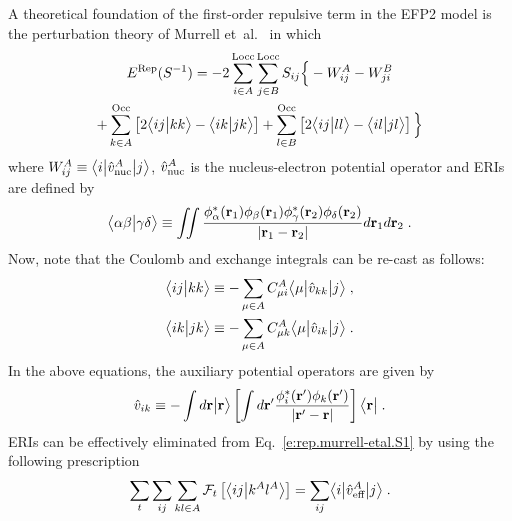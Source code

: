 A theoretical foundation of the
first\hyp{}order repulsive term in the EFP2 model
is the perturbation theory of
Murrell et~al.~\cite{Murrell.Randic.Williams.Longuet-Higgins.ProcRSocLondA.1965} 
in which
%
\begin{multline} \label{e:rep.murrell-etal.S1}
    E^{\rm Rep}(S^{-1}) = -2\sum_{i\in A}^{\rm Locc} \sum_{j\in B}^{\rm Locc}
               S_{ij} \Big\{
         - W^A_{ij} 
         - W^B_{ji} \\
 + \sum_{k\in A}^{\rm Occ} \left[ 2\BraKet{ij}{kk} - \BraKet{ik}{jk} \right] 
 + \sum_{l\in B}^{\rm Occ} \left[ 2\BraKet{ij}{ll} - \BraKet{il}{jl} \right]
                \Big\}
\end{multline}
%
where $W^A_{ij} \equiv \tBraKet{i}{\hat{v}^A_{\rm nuc}}{j}$,
$\hat{v}^A_{\rm nuc}$
is the nucleus\hyp{}electron potential operator
and
ERIs are defined by
%
\begin{equation} \label{e:eri}
	\BraKet{\alpha\beta}{\gamma\delta} \equiv
	\iint 
	\frac{ \phi_\alpha^{*}({\bf r}_1) \phi_\beta({\bf r}_1) 
	       \phi_\gamma^{*}({\bf r}_2) \phi_\delta({\bf r}_2) }{ \vert {\bf r}_1 - {\bf r}_2 \vert}
	d{\bf r}_1 d{\bf r}_2  \;.
\end{equation}
%
Now, note that the Coulomb and exchange integrals can be re\hyp{}cast as follows:
%
\begin{subequations}
 \begin{align}
 \BraKet{ij}{kk} &\equiv - \sum_{\mu\in A} 
     C_{\mu i}^A \tBraKet{\mu}{\hat{v}_{kk}}{j} \;, \\
 \BraKet{ik}{jk} &\equiv - \sum_{\mu\in A} 
     C_{\mu k}^A \tBraKet{\mu}{\hat{v}_{ik}}{j} \;.
 \end{align}
\end{subequations}
%
%
%
In the above equations, the auxiliary potential operators are given by
%
\begin{equation}
  \hat{v}_{ik} \equiv - \int d{\bf r} \Ket{{\bf r}} 
        \left[
        \int d{\bf r}' \frac{\phi_i^{*}({\bf r}') \phi_k({\bf r}')}{\vert {\bf r}' - {\bf r}\vert}
        \right] \Bra{{\bf r}} \;.
\end{equation}
%
ERIs can be effectively eliminated from Eq.~\eqref{e:rep.murrell-etal.S1} 
by using the following prescription~\cite{Blasiak.Bednarska.Choluj.Bartkowiak.JCP.2019}
%
\begin{equation} \label{e:ft-reduction}
	\sum_t \sum_{ij}\sum_{kl\in A} {\mathcal{F}}_t\left[ 
   \BraKet{ij}{k^Al^A}
 \right] = \sum_{ij} \tBraKet{i}{\hat{v}_{\text{eff}}^A}{j} \;.
\end{equation}
